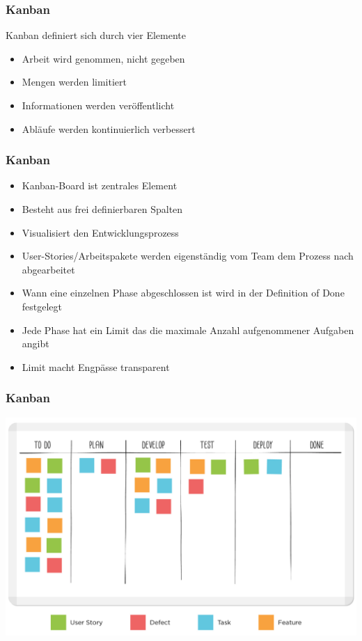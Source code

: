 \begin{frame}
\frametitle{Kanban}
	Kanban definiert sich durch vier Elemente
	\begin{itemize}
		\item Arbeit wird genommen, nicht gegeben
		\item Mengen werden limitiert
		\item Informationen werden veröffentlicht
		\item Abläufe werden kontinuierlich verbessert
	\end{itemize}
\end{frame}

\begin{frame}
\frametitle{Kanban}
	\begin{itemize}
		\item Kanban-Board ist zentrales Element
		\item Besteht aus frei definierbaren Spalten
		\item Visualisiert den Entwicklungsprozess
		\item User-Stories/Arbeitspakete werden eigenständig vom Team dem Prozess nach abgearbeitet
		\item Wann eine einzelnen Phase abgeschlossen ist wird in der Definition of Done festgelegt
		\item Jede Phase hat ein Limit das die maximale Anzahl aufgenommener Aufgaben angibt
		\item Limit macht Engpässe transparent
	\end{itemize}
\end{frame}

\begin{frame}
\frametitle{Kanban}
\center\includegraphics[width=1\textwidth,
	keepaspectratio=true]{bilder/kanban_board.png}
\end{frame}

